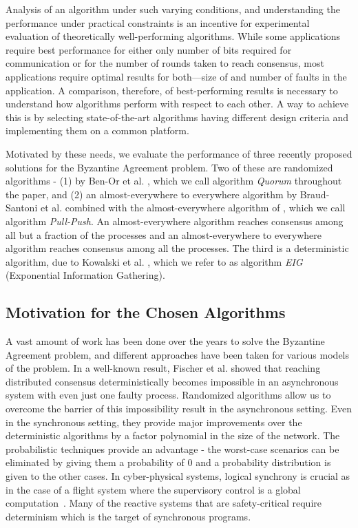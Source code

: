 Analysis of an algorithm under such varying conditions, and understanding the
performance under practical constraints is an incentive for experimental
evaluation of theoretically well-performing algorithms. While some applications
require best performance for either only number of bits required for
communication or for the number of rounds taken to reach consensus, most
applications  require optimal results for both---size
of and number of faults in the application. A comparison, therefore, 
of best-performing results is necessary to understand how algorithms perform with respect to 
each other. A way to achieve this is by selecting state-of-the-art algorithms having different design criteria and implementing them on a common platform.

Motivated by these needs, we evaluate the performance of three recently
proposed solutions for the Byzantine Agreement problem. Two of these are
randomized algorithms - (1) by Ben-Or et al. \cite{BPV06}, which we call
algorithm \textit{Quorum} throughout the paper, and (2) an almost-everywhere to
everywhere algorithm by Braud-Santoni et al.  \cite{BGH13} combined with the
almost-everywhere algorithm of \cite{KSSV06}, which we call algorithm
\textit{Pull-Push}. An almost-everywhere algorithm reaches consensus among all
but a fraction of the processes and an almost-everywhere to everywhere
algorithm reaches consensus among all the processes. 
The third is a deterministic algorithm, due to Kowalski et
al. \cite{KM13}, which we refer to as algorithm \textit{EIG} (Exponential
Information Gathering). 

\subsection{Motivation for the Chosen Algorithms}

A vast amount of work has been done over the years to solve the Byzantine
Agreement problem, and different approaches have been taken for various models
of the problem. In a well-known result, Fischer et al. \cite{FischerLP83}
showed that reaching distributed consensus deterministically becomes impossible
in an asynchronous system with even just one faulty process. Randomized
algorithms allow us to overcome the barrier of this impossibility result in the
asynchronous setting. Even in the synchronous setting, they provide major
improvements over the deterministic algorithms by a factor polynomial in the
size of the network. The probabilistic techniques provide an advantage - the
worst-case scenarios can be eliminated by giving them a probability of $0$ and
a probability distribution is given to the other cases. In cyber-physical systems, 
logical synchrony is crucial as in the case of a flight system where the supervisory control is a global computation~\cite{SASMO}.
Many of the reactive systems that are safety-critical require determinism which is the target of synchronous programs.



